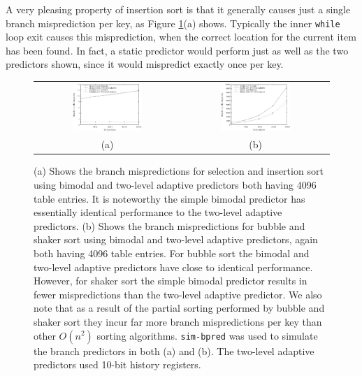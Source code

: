 \documentclass[acmtocl]{acmtrans2m}
\begin{document}
A very pleasing property of insertion sort is that
it generally causes just 
a single branch misprediction per key, as Figure \ref{elementary_sorts}(a) shows. Typically
the inner \texttt{while} loop exit causes this misprediction, when
the correct location for the current item has been found.
In fact, a static
predictor would perform just as well as the two predictors shown, since it
would mispredict exactly once per key.

\begin{figure}
\centering
\begin{tabular}{cc}
\includegraphics[width=0.5\textwidth]{plots/selection_insertion_sort_branches.eps} & \includegraphics[width=0.5\textwidth]{plots/bubble_shaker_sort_branches.eps} \\
(a) & (b) \\
\end{tabular}
\caption{(a) Shows the branch mispredictions for selection and insertion sort using bimodal and two-level adaptive predictors both having 4096 table entries.
It is noteworthy the simple bimodal predictor has essentially identical performance to the two-level adaptive predictors.
(b) Shows the branch mispredictions for bubble and shaker sort using bimodal and two-level adaptive predictors, again both having 4096 table entries.
For bubble sort the bimodal and two-level adaptive predictors have close to identical performance. However, for shaker sort the simple bimodal
predictor results in fewer mispredictions than the two-level adaptive predictor. We also note that as a result of 
the partial sorting performed by bubble and shaker sort they incur far more
branch mispredictions per key than other $O(n^2)$ sorting algorithms.
\texttt{sim-bpred} was used to simulate the branch predictors in both (a) and (b). The two-level adaptive predictors used 10-bit history registers.}
\label{elementary_sorts}
\end{figure}
\end{document}
